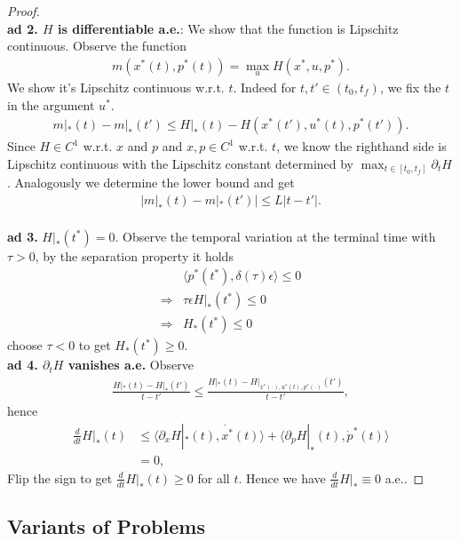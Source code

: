 \documentclass[a4paper,11pt,fleqn]{book}
\theoremstyle{definition}
\theoremstyle{remark}
\begin{document}
\begin{proof}
\quad\\
\textbf{ad 2. $H$ is differentiable a.e.}: We show that the function is Lipschitz continuous. Observe the function
\begin{align*}
	m(x^*(t), p^*(t)) = \max_u H(x^*, u, p^*).
\end{align*}
We show it's Lipschitz continuous w.r.t. $t$. Indeed for $t, t' \in (t_0, t_f)$, we fix the $t$ in the argument $u^*$.  
\begin{align*}
	m|_*(t) - m|_*(t') \le H|_*(t) - H(x^*(t'), u^*(t), p^*(t')).
\end{align*}
Since $H \in C^1$ w.r.t. $x$ and $p$ and $x, p \in C^1$ w.r.t. $t$, we know the righthand side is Lipschitz continuous with the Lipschitz constant determined by $\max_{t \in [t_0, t_f]} \partial_t H$. Analogously we determine the lower bound and get 
\begin{align*}
	|m|_*(t) - m|_*(t')| \le L |t - t'|. 
\end{align*}
\quad\\
\textbf{ad 3.} $H|_*(t^*) = 0$. Observe the temporal variation at the terminal time with $\tau > 0$, by the separation property it holds
\begin{align*}
	& \langle p^*(t^*), \delta(\tau) \epsilon \rangle \le 0\\
	\Rightarrow & \tau \epsilon H|_*(t^*) \le 0 \\
	\Rightarrow & H_*(t^*) \le 0
\end{align*}
choose $\tau < 0$ to get $H_*(t^*) \ge 0$. 
\quad\\
\textbf{ad 4. $\partial_t H$ vanishes a.e.} Observe
\begin{align*}
	\frac{H|_*(t) - H|_*(t')}{t - t'} \le \frac{ H|_*(t) - H|_{x^*(\cdot), u^*(t), p^*(\cdot)}(t')}{t - t'},
\end{align*}
hence
\begin{align*}
	\frac{d}{dt} H|_*(t) &\le \langle \partial_x H|_*(t), \dot{x^*}(t) \rangle + \langle \partial_pH|_*(t), \dot{p}^*(t) \rangle \\
	&= 0,
\end{align*}
Flip the sign to get $\frac{d}{dt}H|_*(t) \ge 0$ for all $t$. Hence we have $\frac{d}{dt}H|_* \equiv 0$ a.e.. 
\end{proof}

\subsection{Variants of Problems}
\end{document}

